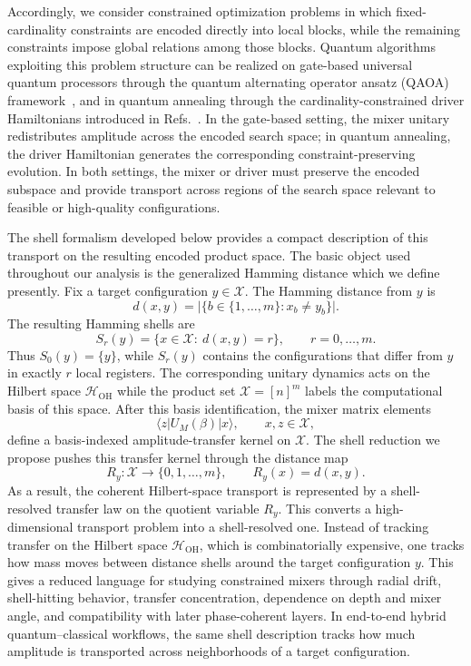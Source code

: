 \documentclass[a4paper,onecolumn,11pt,unpublished]{quantumarticle}
\theoremstyle{remark}
\begin{document}
Accordingly, we consider constrained optimization problems in which fixed-cardinality constraints are encoded directly into local blocks, while the remaining constraints impose global relations among those blocks. Quantum algorithms exploiting this problem structure can be realized on gate-based universal quantum processors through the 
quantum alternating operator ansatz (QAOA) framework~\cite{Hadfield2019AOA}, and in quantum annealing through the cardinality-constrained driver Hamiltonians introduced in
Refs.~\cite{HenSpedalieri2016,HenSarandy2016}. In the gate-based setting, the mixer unitary redistributes amplitude across the encoded search space; in quantum annealing, the driver Hamiltonian generates the corresponding constraint-preserving evolution. In both settings, the mixer or driver must preserve the encoded subspace and provide transport across regions of the search space relevant to feasible or high-quality configurations. 


The shell formalism developed below provides a compact description of this transport on
the resulting encoded product space.  The basic object used throughout our analysis is the generalized Hamming distance which we define presently.  Fix a target configuration \(y\in \mathcal X\).  The Hamming distance from
\(y\) is
\begin{equation}
\label{eq:hamming-distance}
d(x,y)
=
\bigl|\{b\in\{1,\dots,m\}:x_b\neq y_b\}\bigr|.
\end{equation}
The resulting Hamming shells are
\[
S_r(y)=\{x\in \mathcal X:\ d(x,y)=r\},
\qquad r=0,\dots,m.
\]
Thus \(S_0(y)=\{y\}\), while \(S_r(y)\) contains the configurations that
differ from \(y\) in exactly \(r\) local registers. The corresponding unitary dynamics acts on the Hilbert space \(\mathcal H_{\mathrm{OH}}\) while the product set \(\mathcal X=[n]^m\) labels the computational basis of this space.  After this basis identification, the mixer matrix elements
\[
\langle z|U_M(\beta)|x\rangle,
\qquad x,z\in \mathcal X,
\]
define a basis-indexed amplitude-transfer kernel on \( \mathcal X\).  The shell reduction we propose pushes this transfer kernel through the distance map
\[
R_y:\mathcal X\to\{0,1,\dots,m\},
\qquad
R_y(x)=d(x,y).
\]
As a result, the coherent Hilbert-space transport is represented by a shell-resolved
transfer law on the quotient variable \(R_y\). This converts a high-dimensional transport problem into a shell-resolved one. Instead of tracking transfer on the Hilbert space \(\mathcal H_{\mathrm{OH}}\), which is combinatorially expensive, one tracks how mass moves between distance shells
around the target configuration \(y\). This gives a
reduced language for studying constrained mixers through radial drift, shell-hitting behavior, transfer concentration, dependence on depth and mixer angle, and compatibility with later phase-coherent layers. In end-to-end
hybrid quantum--classical workflows, the same shell description tracks how much amplitude is transported across neighborhoods of a target configuration.
\end{document}
